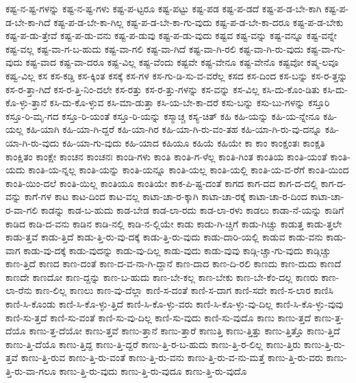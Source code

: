 {ಕಷ್ಟ-ನ-ಷ್ಟ-ಗಳನ್ನು
ಕಷ್ಟ-ನ-ಷ್ಟ-ಗಳು
ಕಷ್ಟ-ಪ-ಟ್ಟರೂ
ಕಷ್ಟ-ಪಟ್ಟು
ಕಷ್ಟ-ಪಡ
ಕಷ್ಟ-ಪ-ಡದೆ
ಕಷ್ಟ-ಪ-ಡ-ಬೇ-ಕಾಗಿ
ಕಷ್ಟ-ಪ-ಡ-ಬೇ-ಕಾ-ಗಿದೆ
ಕಷ್ಟ-ಪ-ಡ-ಬೇ-ಕಾ-ಗಿಲ್ಲ
ಕಷ್ಟ-ಪ-ಡ-ಬೇ-ಕಾ-ಗು-ವುದು
ಕಷ್ಟ-ಪ-ಡ-ಬೇ-ಕಾ-ದರೂ
ಕಷ್ಟ-ಪ-ಡ-ಬೇಕು
ಕಷ್ಟ-ಪ-ಡು-ತ್ತೇವೆ
ಕಷ್ಟ-ಪ-ಡು-ವನು
ಕಷ್ಟ-ಪ-ಡುವು
ಕಷ್ಟ-ಪ-ಡು-ವುದು
ಕಷ್ಟವ
ಕಷ್ಟ-ವನ್ನು
ಕಷ್ಟ-ವನ್ನೂ
ಕಷ್ಟ-ವನ್ನೇ
ಕಷ್ಟ-ವಲ್ಲ
ಕಷ್ಟ-ವಾ-ಗ-ಬ-ಹುದು
ಕಷ್ಟ-ವಾ-ಗಲಿ
ಕಷ್ಟ-ವಾ-ಗಿದೆ
ಕಷ್ಟ-ವಾ-ಗಿ-ರಲಿ
ಕಷ್ಟ-ವಾ-ಗಿ-ರು-ವುದು
ಕಷ್ಟ-ವಾ-ಗು-ವುದು
ಕಷ್ಟ-ವಾದ
ಕಷ್ಟ-ವಾ-ದರೂ
ಕಷ್ಟ-ವಿಲ್ಲ
ಕಷ್ಟ-ವೆಂದು
ಕಷ್ಟವೇ
ಕಷ್ಟ-ವೇನೂ
ಕಷ್ಟ-ವೇನೊ
ಕಷ್ಟವೋ
ಕಷ್ಮ-ಲವೂ
ಕಷ್ವ-ವಿಲ್ಲ
ಕಸ
ಕಸ-ಕಡ್ಡಿ
ಕಸ-ಕ್ಕಿಂತ
ಕಸಕ್ಕೆ
ಕಸ-ಗಳ
ಕಸ-ಗು-ಡಿ-ಸು-ವ-ವರೆಲ್ಲ
ಕಸದ
ಕಸ-ದಿಂದ
ಕಸ-ಬನ್ನು
ಕಸ-ರ-ತ್ತನ್ನು
ಕಸ-ರ-ತ್ತಾ-ಗಿದೆ
ಕಸ-ರ-ತ್ತಿ-ನಿಂ-ದಲೇ
ಕಸ-ರತ್ತು
ಕಸ-ರ-ತ್ತು-ಗಳನ್ನು
ಕಸ-ವನ್ನು
ಕಸ-ವಿಲ್ಲ
ಕಸಿ-ದು-ಕೊಂ-ಡಿತು
ಕಸಿ-ದು-ಕೊ-ಳ್ಳು-ತ್ತಾನೆ
ಕಸಿ-ದು-ಕೊ-ಳ್ಳುವ
ಕಸಿ-ಮಾ-ಡುತ್ತಾ
ಕಸಿ-ಯ-ಬೇ-ಕಾ-ದರೆ
ಕಸು-ಬನ್ನು
ಕಸು-ಬು-ಗಳನ್ನು
ಕಸ್ತೂರಿ
ಕಸ್ತೂ-ರಿ-ಮೃ-ಗದ
ಕಸ್ತೂ-ರಿ-ಯಂತೆ
ಕಸ್ತೂ-ರಿ-ಯನ್ನು
ಕಸ್ಮಾಚ್ಚ
ಕಸ್ಯ-ಚಿತ್
ಕಹಿ
ಕಹಿ-ಯನ್ನು
ಕಹಿ-ಯ-ನ್ನೇನೂ
ಕಹಿ-ಯಲ್ಲ
ಕಹಿ-ಯಾಗಿ
ಕಹಿ-ಯಾ-ಗಿ-ದ್ದರೆ
ಕಹಿ-ಯಾ-ಗಿರ
ಕಹಿ-ಯಾ-ಗಿ-ರು-ವಂ-ತಹ
ಕಹಿ-ಯಾ-ಗಿ-ರು-ವು-ದನ್ನೂ
ಕಹಿ-ಯಾ-ಗಿ-ರು-ವುದು
ಕಹಿ-ಯಾ-ಗು-ವುದು
ಕಹಿ-ಯಾದ
ಕಹಿಯೂ
ಕಹಿಯೆ
ಕಹಿಯೇ
ಕಾ
ಕಾಂ
ಕಾಂಕ್ಷಂತಃ
ಕಾಂಕ್ಷತಿ
ಕಾಂಕ್ಷಿತಂ
ಕಾಂಕ್ಷೇ
ಕಾಂಚನ
ಕಾಂಚನಃ
ಕಾಂಡಿ-ಗಳು
ಕಾಂತಿ
ಕಾಂತಿ-ಗ-ಳೆಲ್ಲ
ಕಾಂತಿ-ಗಿಂತ
ಕಾಂತಿಯ
ಕಾಂತಿ-ಯಂತೆ
ಕಾಂತಿ-ಯದು
ಕಾಂತಿ-ಯ-ನ್ನಲ್ಲ
ಕಾಂತಿ-ಯನ್ನು
ಕಾಂತಿ-ಯನ್ನೂ
ಕಾಂತಿ-ಯಲ್ಲ
ಕಾಂತಿ-ಯಲ್ಲಿ
ಕಾಂತಿ-ಯ-ವ-ರೆಗೆ
ಕಾಂತಿ-ಯಿಂದ
ಕಾಂತಿ-ಯಿಂ-ದಲೆ
ಕಾಂತಿ-ಯಿಲ್ಲ
ಕಾಂತಿಯೂ
ಕಾಂತಿಯೇ
ಕಾಕ-ಪಿ-ಷ್ಟ-ದಂತೆ
ಕಾಗದ
ಕಾಗ-ದದ
ಕಾಗ-ದ-ದಲ್ಲಿ
ಕಾಗ-ದ-ವನ್ನು
ಕಾಗೆ-ಗಳ
ಕಾಟ
ಕಾಟ-ದಿಂದ
ಕಾಟ-ವಲ್ಲ
ಕಾಟಾ-ಚಾ-ರ-ಕ್ಕಾಗಿ
ಕಾಟಾ-ಚಾ-ರಕ್ಕೆ
ಕಾಟಾ-ಚಾ-ರ-ದಿಂದ
ಕಾಟಾ-ಚಾ-ರ-ವಾ-ಗಲಿ
ಕಾಡನ್ನು
ಕಾಡ-ಬ-ಹುದು
ಕಾಡ-ಬೇಡ
ಕಾಡ-ಲಾ-ರದು
ಕಾಡ-ಲಾ-ರಳು
ಕಾಡಲು
ಕಾಡಾ-ನೆ-ಯನ್ನು
ಕಾಡಿಗೆ
ಕಾಡಿದ
ಕಾಡಿ-ದ-ವನು
ಕಾಡಿನ
ಕಾಡಿ-ನಲ್ಲಿ
ಕಾಡಿ-ನ-ಲ್ಲಿಯೇ
ಕಾಡು
ಕಾಡು-ಗಿ-ಚ್ಚಿಗೆ
ಕಾಡು-ಗಿಚ್ಚು
ಕಾಡುತ್ತ
ಕಾಡು-ತ್ತಲೇ
ಕಾಡು-ತ್ತವೆ
ಕಾಡು-ತ್ತಿದೆ
ಕಾಡು-ತ್ತಿ-ರು-ವು-ದಕ್ಕೆ
ಕಾಡು-ತ್ತಿ-ರು-ವುದು
ಕಾಡು-ದಾರಿ-ಯಲ್ಲಿ
ಕಾಡುವ
ಕಾಡು-ವನು
ಕಾಡು-ವಾಗ
ಕಾಡು-ವು-ದಕ್ಕೆ
ಕಾಡು-ವುದನ್ನು
ಕಾಡು-ವು-ದಿಲ್ಲ
ಕಾಡು-ವುದು
ಕಾಡು-ವುವು
ಕಾಡ್ಗಿ-ಚ್ಚಾ-ಗು-ವುದು
ಕಾಡ್ಗಿಚ್ಚು
ಕಾಣ-ತ್ತಿದೆ
ಕಾಣದ
ಕಾಣ-ದಂತೆ
ಕಾಣ-ದ-ವ-ನಾ-ಗಿ-ದ್ದಾನೆ
ಕಾಣ-ದಾದ
ಕಾಣ-ದಿ-ರಲಿ
ಕಾಣದು
ಕಾಣ-ದುದು
ಕಾಣದೆ
ಕಾಣದೇ
ಕಾಣದೋ
ಕಾಣ-ದ್ದನ್ನು
ಕಾಣ-ಬ-ಹುದು
ಕಾಣ-ಬೇ-ಕಲ್ಲ
ಕಾಣ-ಬೇಕು
ಕಾಣ-ಬೇ-ಕೆಂ-ದಲ್ಲ
ಕಾಣರು
ಕಾಣ-ಲಾ-ರೆನು
ಕಾಣ-ಲಿಲ್ಲ
ಕಾಣಲು
ಕಾಣ-ವು-ದೆಲ್ಲಾ
ಕಾಣಿ-ಸ-ದಂತೆ
ಕಾಣಿ-ಸ-ದಾಗ
ಕಾಣಿ-ಸದೇ
ಕಾಣಿ-ಸ-ಲಾರ
ಕಾಣಿಸಿ
ಕಾಣಿ-ಸಿ-ಕೊಂಡು
ಕಾಣಿ-ಸಿ-ಕೊ-ಳ್ಳು-ತ್ತಿದೆ
ಕಾಣಿ-ಸಿ-ಕೊ-ಳ್ಳು-ವರು
ಕಾಣಿ-ಸಿ-ಕೊ-ಳ್ಳು-ವು-ದಿಲ್ಲ
ಕಾಣಿ-ಸಿ-ಕೊ-ಳ್ಳು-ವುವು
ಕಾಣಿ-ಸು-ತ್ತದೆ
ಕಾಣಿ-ಸು-ವಂತೆ
ಕಾಣಿ-ಸು-ವು-ದಿಲ್ಲ
ಕಾಣಿ-ಸು-ವುದು
ಕಾಣಿ-ಸು-ವುದೊ
ಕಾಣು
ಕಾಣು-ತ್ತದೆ
ಕಾಣು-ತ್ತ-ದೆಯೊ
ಕಾಣು-ತ್ತ-ದೆಯೋ
ಕಾಣು-ತ್ತವೆ
ಕಾಣು-ತ್ತಾನೆ
ಕಾಣು-ತ್ತಾರೆ
ಕಾಣುತ್ತಿ
ಕಾಣು-ತ್ತಿತ್ತು
ಕಾಣು-ತ್ತಿತ್ತೊ
ಕಾಣು-ತ್ತಿದೆ
ಕಾಣು-ತ್ತಿ-ದೆಯೊ
ಕಾಣು-ತ್ತಿದ್ದ
ಕಾಣು-ತ್ತಿ-ದ್ದರೆ
ಕಾಣು-ತ್ತಿ-ರ-ಬ-ಹುದು
ಕಾಣು-ತ್ತಿ-ರ-ಲಿಲ್ಲ
ಕಾಣು-ತ್ತಿರು
ಕಾಣು-ತ್ತಿ-ರು-ತ್ತವೆ
ಕಾಣು-ತ್ತಿ-ರುವ
ಕಾಣು-ತ್ತಿ-ರು-ವಂತೆ
ಕಾಣು-ತ್ತಿ-ರು-ವನು
ಕಾಣು-ತ್ತಿ-ರು-ವ-ನು-ಮತ್ತೆ
ಕಾಣು-ತ್ತಿ-ರು-ವರು
ಕಾಣು-ತ್ತಿ-ರು-ವಾ-ಗಲೂ
ಕಾಣು-ತ್ತಿ-ರು-ವುದು
ಕಾಣು-ತ್ತಿ-ರು-ವುದೂ
ಕಾಣು-ತ್ತಿ-ರು-ವುದೊ
}
